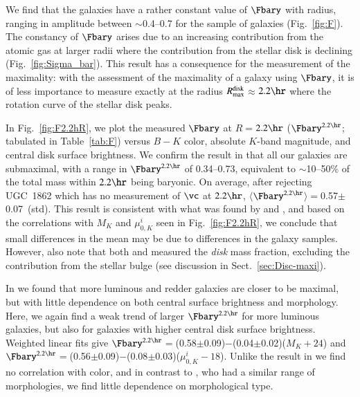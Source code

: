 \documentclass[traditabstract]{aa} %
\begin{document}
We find that the galaxies have a rather constant value of $\Fbary$ with radius, ranging in
amplitude between $\sim$0.4--0.7 for the sample of galaxies (Fig.~\ref{fig:F}). The
constancy of $\Fbary$ arises due to an increasing contribution from the atomic gas at
larger radii where the contribution from the stellar disk is declining
(Fig.~\ref{fig:Sigma_bar}). This result has a consequence for the measurement of the
maximality: with the assessment of the maximality of a galaxy using $\Fbary$, it is of
less importance to measure exactly at the radius $R_{\rm max}^{\rm disk}$$\approx$$2.2\hr$
where the rotation curve of the stellar disk peaks.

In Fig.~\ref{fig:F2.2hR}, we plot the measured $\Fbary$ at $R$$=$$2.2\hr$ 
($\Fbary^{2.2\hr}$; tabulated in Table~\ref{tab:F}) versus $B-K$ color, absolute $K$-band
magnitude, and central disk surface brightness. We confirm the result in 
 that all our galaxies are submaximal, with a range in
$\Fbary^{2.2\hr}$ of 0.34--0.73, equivalent to $\sim$10--50\% of the total mass within
$2.2\hr$ being baryonic. On average, after rejecting UGC~1862 which has no measurement
of $\vc$ at $2.2\hr$, $\langle$$\Fbary^{2.2\hr}$$\rangle$$=$0.57$\pm$0.07~(std).
%
This result is consistent with what was found by \cite{bottema1993} and
\cite{kregel2005}, and based on the correlations with $M_K$ and $\mu_{0,K}^{i}$ seen in
Fig.~\ref{fig:F2.2hR}, we conclude that small differences in the mean may be due to
differences in the galaxy samples. However, also note that both \cite{bottema1993} and
\cite{kregel2005} measured the {\it disk} mass fraction, excluding the contribution from
the stellar bulge (see discussion in Sect.~\ref{sec:Disc-maxi}).

In  we found that more luminous and redder galaxies are closer to
be maximal, but with little dependence on both central surface brightness and morphology.
Here, we again find a weak trend of larger $\Fbary^{2.2\hr}$ for more luminous galaxies,
but also for galaxies with higher central disk surface brightness.
%
Weighted linear fits give 
$\Fbary^{2.2\hr}$$=$(0.58$\pm$0.09)$-$(0.04$\pm$0.02)($M_K+24$) and 
$\Fbary^{2.2\hr}$$=$(0.56$\pm$0.09)$-$(0.08$\pm$0.03)($\mu_{0,K}^{i}-18$).
Unlike the result in  we find no correlation with color, and in
contrast to \cite{herrmann2009}, who had a similar range of morphologies, we find little
dependence on morphological type.



\end{document}
